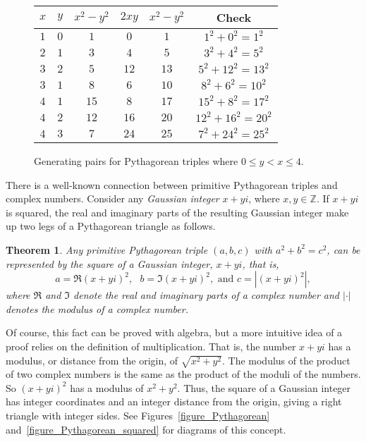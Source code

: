 \documentclass[12pt,table]{article}
\newtheorem{theorem}{Theorem}[section]
\theoremstyle{definition}
\theoremstyle{remark}
\newcommand{\Zzz}{\mathbb Z}
\numberwithin{equation}{section}
\begin{document}
\begin{figure}
\begin{center}
\begin{tabular}{ c|c|c|c|c|c } 

 $x$ & $y$ & $x^2 - y^2$ & $2xy$ & $x^2 - y^2$ & Check \\  
 \hline
 $1$ & $0$ & $1$ & $0$ & $1$ & $1^2 + 0^2 = 1^2$ \\  
 $2$ & $1$ & $3$ & $4$ & $5$ & $3^2 + 4^2 = 5^2$ \\  
 $3$ & $2$ & $5$ & $12$ & $13$ & $5^2 + 12^2 = 13^2$ \\  
 $3$ & $1$ & $8$ & $6$ & $10$ & $8^2 + 6^2 = 10^2$ \\  
 $4$ & $1$ & $15$ & $8$ & $17$ & $15^2 + 8^2 = 17^2$ \\  
 $4$ & $2$ & $12$ & $16$ & $20$ & $12^2 + 16^2 = 20^2$ \\  
 $4$ & $3$ & $7$ & $24$ & $25$ & $7^2 + 24^2 = 25^2$ \\  
\end{tabular}
\caption{Generating pairs for Pythagorean triples where
$0 \leq y < x \leq 4$.}
\end{center}
\label{figure_triples}
\end{figure}







There is a well-known connection between primitive Pythagorean triples
and complex numbers. Consider any {\em Gaussian integer} $x+yi$,
where $x, y \in \Zzz$.
If $x + yi$  is squared, the real and imaginary
parts of the resulting Gaussian integer make up two legs of
a Pythagorean triangle as follows. 


\begin{theorem}
Any primitive Pythagorean triple $(a,b,c)$ with
$a^2 + b^2 = c^2$, can be represented
by the square of a Gaussian integer, $x+yi$,
that is,
\[
    a =  \Re{(x+yi)^2},  \:\:\: b = \Im{(x+yi)^2},
    \mbox{   and   }
    c = |(x+yi)^2|,
\]
where $\Re$ and $\Im$ denote the real and imaginary parts of a complex number
and
$| \cdot |$ denotes the modulus of a complex number.
\end{theorem}



Of course, this fact can be proved with
algebra, but a more intuitive 
idea of a proof relies on the definition 
of multiplication. That is, the number $x+yi$ has a modulus, or     
distance from the origin, of $\sqrt{x^2+y^2}$. The modulus of the       
product of two complex numbers is the same as the product of
the moduli of the numbers.
So $(x+yi)^2$ has a modulus of $x^2+y^2$. Thus, the square of a 
Gaussian integer has integer coordinates and an integer distance
from the origin, giving a right triangle with integer sides.
See Figures~\ref{figure_Pythagorean} 
and~\ref{figure_Pythagorean_squared} for diagrams of this 
concept.
\end{document}
